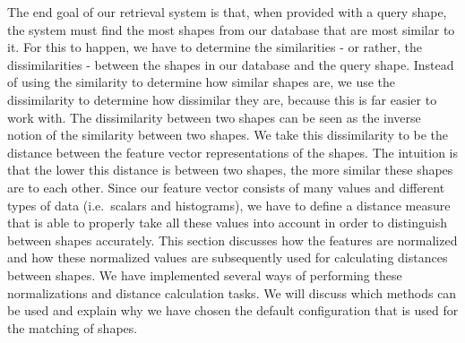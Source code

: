 The end goal of our retrieval system is that, when provided with a query shape, the system must find the most
shapes from our database that are most similar to it.
For this to happen, we have to determine the similarities - or rather, the dissimilarities - between the shapes in our
database and the query shape.
Instead of using the similarity to determine how similar shapes are, we use the dissimilarity to determine how dissimilar they are, because this is far easier to work with.
The dissimilarity between two shapes can be seen as the inverse notion of the similarity between two shapes.
We take this dissimilarity to be the distance between the feature vector representations of the shapes.
The intuition is that the lower this distance is between two shapes, the more similar these shapes are to each other.
Since our feature vector consists of many values and different types of data (i.e.\ scalars and histograms), we have to define a distance measure that is able to properly take all these values into account in order to distinguish between shapes accurately.
This section discusses how the features are normalized and how these normalized values are subsequently used for calculating distances between shapes.
We have implemented several ways of performing these normalizations and distance calculation tasks.
We will discuss which methods can be used and explain why we have chosen the default configuration that is used for the matching of shapes.

